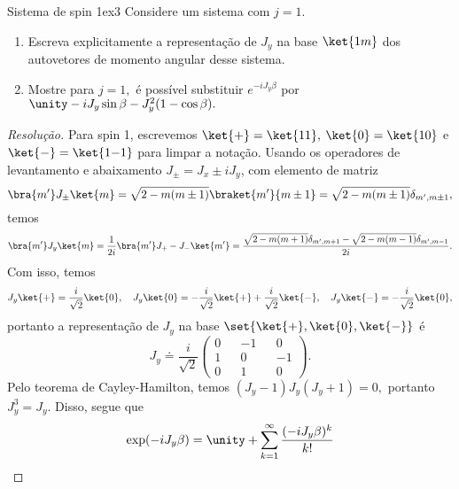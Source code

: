 \begin{exercício}{Sistema de spin 1}{ex3}
    Considere um sistema com \(j = 1\).
    \begin{enumerate}[label=(\alph*)]
        \item Escreva explicitamente a representação de \(J_y\) na base \(\ket{1m}\) dos autovetores de momento angular desse sistema.
        \item Mostre para \(j = 1,\) é possível substituir \(e^{-i J_y \beta}\) por \(\unity - i J_y \sin \beta - J_y^2(1 - \cos \beta).\)
    \end{enumerate}
\end{exercício}
\begin{proof}[Resolução]
    Para spin 1, escrevemos \(\ket{+} = \ket{11},\) \(\ket{0} = \ket{10}\) e \(\ket{-} = \ket{1{-1}}\) para limpar a notação. Usando os operadores de levantamento e abaixamento \(J_{\pm} = J_x \pm i J_y\), com elemento de matriz
    \begin{equation*}
        \bra{m'} J_{\pm} \ket{m} = \sqrt{2 - m(m \pm 1)} \braket{m'}{m \pm 1} = \sqrt{2 - m(m\pm1)} \delta_{m', m\pm1},
    \end{equation*}
    temos
    \begin{equation*}
        \bra{m'} J_y \ket{m} =\frac{1}{2i}  \bra{m'} J_+ - J_- \ket{m'} = \frac{\sqrt{2 - m(m+1)} \delta_{m', m+1} - \sqrt{2 - m(m-1)} \delta_{m', m - 1}}{2i}.
    \end{equation*}
    Com isso, temos
    \begin{equation*}
        J_y \ket{+} = \frac{i}{\sqrt{2}}\ket{0},\quad
        J_y\ket{0} = -\frac{i}{\sqrt{2}} \ket{+} + \frac{i}{\sqrt{2}} \ket{-},\quad
        J_y \ket{-} = -\frac{i}{\sqrt{2}}\ket{0},
    \end{equation*}
    portanto a representação de \(J_y\) na base \(\set{\ket{+}, \ket{0}, \ket{-}}\) é
    \begin{equation*}
        J_y \doteq \frac{i}{\sqrt{2}} \begin{pmatrix}
            0 && -1 && 0\\
            1 && 0 && -1\\
            0 && 1 && 0
        \end{pmatrix}.
    \end{equation*}
    Pelo teorema de Cayley-Hamilton, temos \((J_y - 1)J_y(J_y + 1) = 0,\) portanto \(J_y^3 = J_y.\) Disso, segue que
    \begin{align*}
        \exp(-i J_y \beta) = \unity + \sum_{k = 1}^\infty \frac{(-i J_y \beta)^k}{k!} 

\end{align*}
\end{proof}
